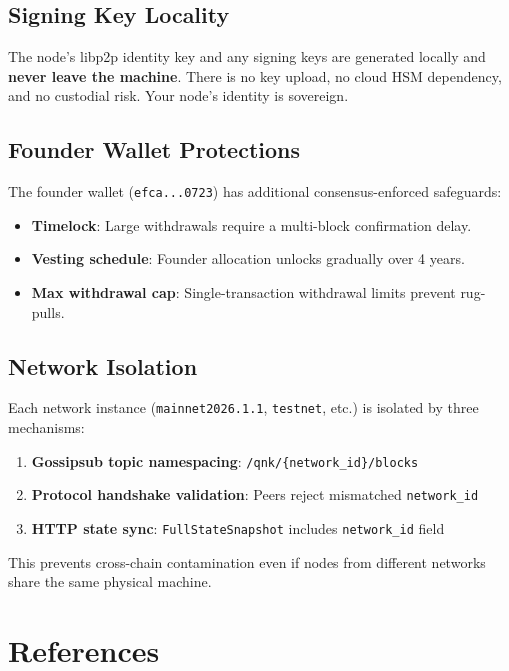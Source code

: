 \documentclass[11pt,a4paper]{article}
\begin{document}
\subsection{Signing Key Locality}

The node's libp2p identity key and any signing keys are generated locally
and \textbf{never leave the machine}. There is no key upload, no cloud HSM
dependency, and no custodial risk. Your node's identity is sovereign.

\subsection{Founder Wallet Protections}

The founder wallet (\texttt{efca...0723}) has additional consensus-enforced
safeguards:

\begin{itemize}[nosep]
    \item \textbf{Timelock}: Large withdrawals require a multi-block confirmation delay.
    \item \textbf{Vesting schedule}: Founder allocation unlocks gradually over 4 years.
    \item \textbf{Max withdrawal cap}: Single-transaction withdrawal limits prevent rug-pulls.
\end{itemize}

\subsection{Network Isolation}

Each network instance (\texttt{mainnet2026.1.1}, \texttt{testnet}, etc.) is
isolated by three mechanisms:

\begin{enumerate}[nosep]
    \item \textbf{Gossipsub topic namespacing}: \texttt{/qnk/\{network\_id\}/blocks}
    \item \textbf{Protocol handshake validation}: Peers reject mismatched \texttt{network\_id}
    \item \textbf{HTTP state sync}: \texttt{FullStateSnapshot} includes \texttt{network\_id} field
\end{enumerate}

This prevents cross-chain contamination even if nodes from different networks
share the same physical machine.

\section*{References}
\end{document}
